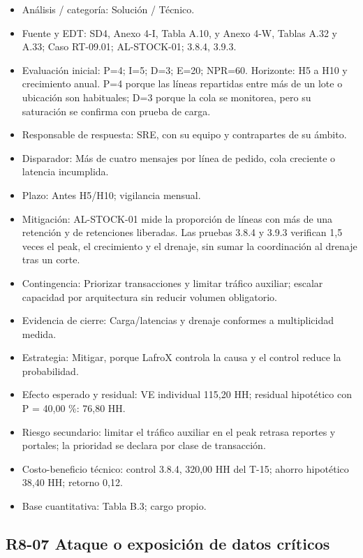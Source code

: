 \begin{itemize}[leftmargin=*,itemsep=3pt]
\item Análisis / categoría: Solución / Técnico.
\item Fuente y EDT: SD4, Anexo 4-I, Tabla A.10, y Anexo 4-W, Tablas A.32 y A.33; Caso RT-09.01; AL-STOCK-01; 3.8.4, 3.9.3.
\item Evaluación inicial: P=4; I=5; D=3; E=20; NPR=60. Horizonte: H5 a H10 y crecimiento anual. P=4 porque las líneas repartidas entre más de un lote o ubicación son habituales; D=3 porque la cola se monitorea, pero su saturación se confirma con prueba de carga.
\item Responsable de respuesta: SRE, con su equipo y contrapartes de su ámbito.
\item Disparador: Más de cuatro mensajes por línea de pedido, cola creciente o latencia incumplida.
\item Plazo: Antes H5/H10; vigilancia mensual.
\item Mitigación: AL-STOCK-01 mide la proporción de líneas con más de una retención y de retenciones liberadas. Las pruebas 3.8.4 y 3.9.3 verifican 1,5 veces el peak, el crecimiento y el drenaje, sin sumar la coordinación al drenaje tras un corte.
\item Contingencia: Priorizar transacciones y limitar tráfico auxiliar; escalar capacidad por arquitectura sin reducir volumen obligatorio.
\item Evidencia de cierre: Carga/latencias y drenaje conformes a multiplicidad medida.
\item Estrategia: Mitigar, porque LafroX controla la causa y el control reduce la probabilidad.
\item Efecto esperado y residual: VE individual 115,20 HH; residual hipotético con P = 40,00 \%: 76,80 HH.
\item Riesgo secundario: limitar el tráfico auxiliar en el peak retrasa reportes y portales; la prioridad se declara por clase de transacción.
\item Costo-beneficio técnico: control 3.8.4, 320,00 HH del T-15; ahorro hipotético 38,40 HH; retorno 0,12.
\item Base cuantitativa: Tabla B.3; cargo propio.
\end{itemize}

\subsection*{R8-07 \textemdash{} Ataque o exposición de datos críticos}

